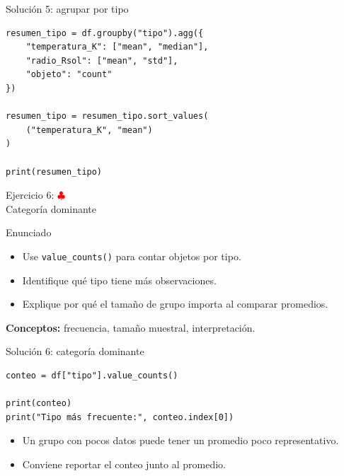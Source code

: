 \documentclass[10pt]{beamer}
\begin{document}
\begin{solutionblock}
\begin{frame}[fragile,shrink=5]{Solución 5: agrupar por tipo}
\begin{verbatim}
resumen_tipo = df.groupby("tipo").agg({
    "temperatura_K": ["mean", "median"],
    "radio_Rsol": ["mean", "std"],
    "objeto": "count"
})

resumen_tipo = resumen_tipo.sort_values(
    ("temperatura_K", "mean")
)

print(resumen_tipo)
\end{verbatim}
\end{frame}
\end{solutionblock}

\begin{frame}{Ejercicio 6: \hfill \textcolor{red}{$\clubsuit$} \\ Categoría dominante}
  \begin{block}{Enunciado}
    \begin{itemize}
      \item Use \texttt{value\_counts()} para contar objetos por tipo.
      \item Identifique qué tipo tiene más observaciones.
      \item Explique por qué el tamaño de grupo importa al comparar promedios.
    \end{itemize}
  \end{block}
  \textbf{Conceptos:} frecuencia, tamaño muestral, interpretación.
\end{frame}

\begin{solutionblock}
\begin{frame}[fragile]{Solución 6: categoría dominante}
\begin{verbatim}
conteo = df["tipo"].value_counts()

print(conteo)
print("Tipo más frecuente:", conteo.index[0])
\end{verbatim}

  \begin{itemize}
    \item Un grupo con pocos datos puede tener un promedio poco representativo.
    \item Conviene reportar el conteo junto al promedio.
  \end{itemize}
\end{frame}
\end{solutionblock}

\end{document}
